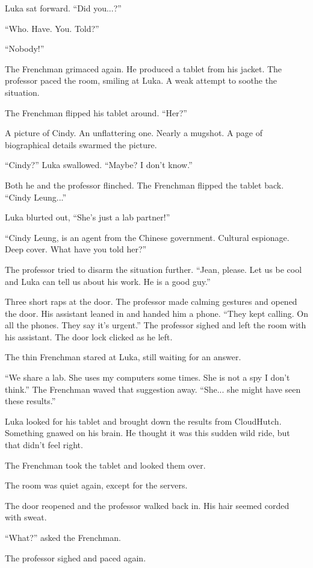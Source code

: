 \documentclass[ebook,11pt,oneside,openany]{memoir}
\begin{document}
Luka sat forward. ``Did you...?''

``Who. Have. You. Told?''

``Nobody!''

The Frenchman grimaced again. He produced a tablet from his jacket. The professor paced the room, smiling at Luka. A weak attempt to soothe the situation.

The Frenchman flipped his tablet around. ``Her?''

A picture of Cindy. An unflattering one. Nearly a mugshot. A page of biographical details swarmed the picture.

``Cindy?'' Luka swallowed. ``Maybe? I don't know.''

Both he and the professor flinched. The Frenchman flipped the tablet back. ``Cindy Leung...''

Luka blurted out, ``She's just a lab partner!''

``Cindy Leung, is an agent from the Chinese government. Cultural espionage. Deep cover. What have you told her?''

The professor tried to disarm the situation further. ``Jean, please. Let us be cool and Luka can tell us about his work. He is a good guy.''

Three short raps at the door. The professor made calming gestures and opened the door. His assistant leaned in and handed him a phone. ``They kept calling. On all the phones. They say it's urgent.'' The professor sighed and left the room with his assistant. The door lock clicked as he left.

The thin Frenchman stared at Luka, still waiting for an answer.

``We share a lab. She uses my computers some times. She is not a spy I don't think.'' The Frenchman waved that suggestion away. ``She... she might have seen these results.''

Luka looked for his tablet and brought down the results from CloudHutch. Something gnawed on his brain. He thought it was this sudden wild ride, but that didn't feel right.

The Frenchman took the tablet and looked them over.

The room was quiet again, except for the servers.

The door reopened and the professor walked back in. His hair seemed corded with sweat.

``What?'' asked the Frenchman.

The professor sighed and paced again.
\end{document}

